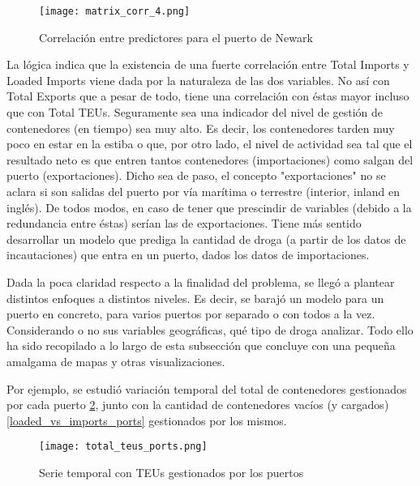 \documentclass[12pt]{article}
\begin{document}
		\begin{figure}[H]
			\caption{\label{matriz_corr_4} Correlación entre predictores para el puerto de Newark}
			\centering
			\hspace*{1cm}
			\texttt{[image: matrix\_corr\_4.png]}
		\end{figure}
	
		La lógica indica que la existencia de una fuerte correlación entre Total Imports y Loaded Imports viene dada por la naturaleza de las dos variables. No así con Total Exports que a pesar de todo, tiene una correlación con éstas mayor incluso que con Total TEUs. Seguramente sea una indicador del nivel de gestión de contenedores (en tiempo) sea muy alto. Es decir, los contenedores tarden muy poco en estar en la estiba o que, por otro lado, el nivel de actividad sea tal que el resultado neto es que entren tantos contenedores (importaciones) como salgan del puerto (exportaciones). Dicho sea de paso, el concepto "exportaciones" no se aclara si son salidas del puerto por vía marítima o terrestre (interior, inland en inglés). De todos modos, en caso de tener que prescindir de variables (debido a la redundancia entre éstas) serían las de exportaciones. Tiene más sentido desarrollar un modelo que prediga la cantidad de droga (a partir de los datos de incautaciones) que entra en un puerto, dados los datos de importaciones.
		
		
		Dada la poca claridad respecto a la finalidad del problema, se llegó a plantear distintos enfoques a distintos niveles. Es decir, se barajó un modelo para un puerto en concreto, para varios puertos por separado o con todos a la vez. Considerando o no sus variables geográficas, qué tipo de droga analizar. Todo ello ha sido recopilado a lo largo de esta subsección que concluye con una pequeña amalgama de mapas y otras visualizaciones.
		
		Por ejemplo, se estudió variación temporal del total de contenedores gestionados por cada puerto \ref{total_teus_ports}, junto con la cantidad de contenedores vacíos (y cargados) \ref{loaded_vs_imports_ports} gestionados por los mismos.
		
		\begin{figure}[H]
			\caption{\label{total_teus_ports} Serie temporal con TEUs gestionados por los puertos}
			\centering
			\hspace*{1cm}
			\texttt{[image: total\_teus\_ports.png]}
		\end{figure}
		
\end{document}

